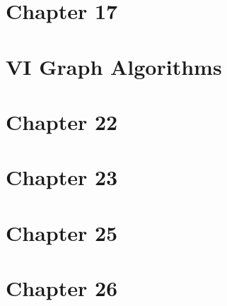 \documentclass[12pt,a4paper]{article}
\begin{document}
\pagebreak


\section*{Chapter 17}







\pagebreak


\section*{VI Graph Algorithms}
\pagebreak


\section*{Chapter 22}






\pagebreak


\section*{Chapter 23}






\pagebreak

\section*{Chapter 25}




\pagebreak



\section*{Chapter 26}







\pagebreak
\end{document}
